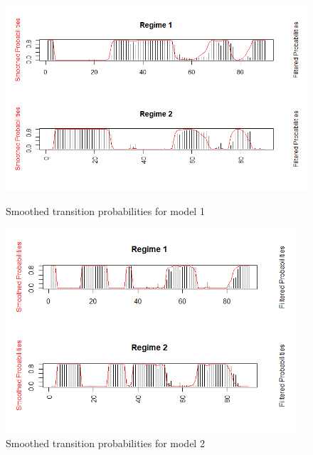 \documentclass{article}
\begin{document}
\begin{figure}[htbp]
	\begin{center}
		\includegraphics[height=3in]{prob.png}
		\caption{Smoothed transition probabilities for model 1}
	\end{center}
\end{figure}
\begin{figure}[htbp]
	\begin{center}
		\includegraphics[height=3in]{regimes_model2.png}
		\caption{Smoothed transition probabilities for model 2}
	\end{center}
\end{figure}





\end{document}

